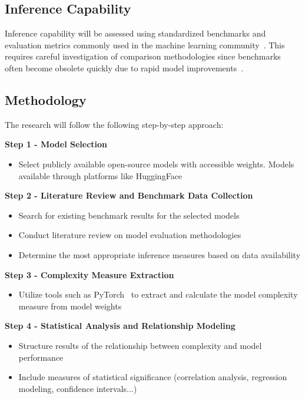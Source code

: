     \subsection{Inference Capability}

        Inference capability will be assessed using standardized benchmarks and evaluation metrics commonly used in the machine learning community~\cite{liang2022holistic, wang2019superglue}. This requires careful investigation of comparison methodologies since benchmarks often become obsolete quickly due to rapid model improvements~\cite{raji2021ai}.

    \subsection{Methodology}

        The research will follow the following step-by-step approach:

        \textbf{Step 1 - Model Selection}
        \begin{itemize}
            \item Select publicly available open-source models with accessible weights. Models available through platforms like HuggingFace
        \end{itemize}

        \textbf{Step 2 - Literature Review and Benchmark Data Collection}
        \begin{itemize}
            \item Search for existing benchmark results for the selected models
            \item Conduct literature review on model evaluation methodologies
            \item Determine the most appropriate inference measures based on data availability
        \end{itemize}

        \textbf{Step 3 - Complexity Measure Extraction}
        \begin{itemize}
            \item Utilize tools such as PyTorch~\cite{paszke2019pytorch} to extract and calculate the model complexity measure from model weights
        \end{itemize}

        \textbf{Step 4 - Statistical Analysis and Relationship Modeling}
        \begin{itemize}
            \item Structure results of the relationship between complexity and model performance
            \item Include measures of statistical significance (correlation analysis, regression modeling, confidence intervals...)
        \end{itemize}
